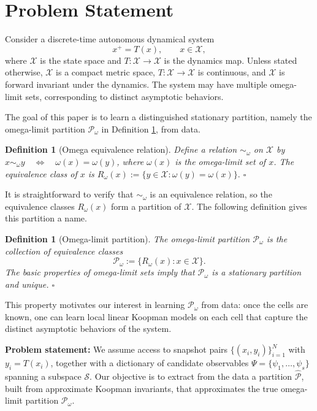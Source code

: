 \documentclass[letterpaper, 10 pt, conference]{ieeeconf}
\newcommand{\Pc}{\mathcal{P}}
\newcommand{\Sc}{\mathcal{S}}
\newcommand{\Xc}{\mathcal{X}}
\newcommand{\oprocendsymbol}{\hbox{$\square$}}
\newcommand{\oprocend}{\relax\ifmmode\else\unskip\hfill\fi\oprocendsymbol}
\newtheorem{definition}[theorem]{Definition}
\begin{document}
\section{Problem Statement}
Consider a discrete-time autonomous dynamical system
\begin{equation}
\label{eq:dynamics}
    x^+ = T(x), \qquad x \in \Xc,
\end{equation}
where $\Xc$ is the state space and $T:\Xc\to \Xc$ is the dynamics map. Unless stated otherwise, $\Xc$ is a compact metric space, $T:\Xc\to\Xc$ is continuous, and $\Xc$ is forward invariant under the dynamics. The system may have multiple omega-limit sets, corresponding to distinct asymptotic behaviors.

The goal of this paper is to learn a distinguished stationary partition, namely the omega-limit partition $\mathcal P_\omega$ in Definition \ref{def:omega_limit_partition}, from data.
\begin{definition}[Omega equivalence relation]
Define a relation $\sim_\omega$ on $\Xc$ by $    x\sim_\omega y
    \quad\Longleftrightarrow\quad
    \omega(x)=\omega(y)$, where $\omega(x)$ is the omega-limit set of $x$.
The equivalence class of $x$ is $R_\omega(x)
    :=
    \{y\in\Xc:\omega(y)=\omega(x)\}.$
\oprocend
\end{definition}

\smallskip
It is straightforward to verify that $\sim_\omega$ is an equivalence relation, so the equivalence classes $R_\omega(x)$ form a partition of $\Xc$. The following definition gives this partition a name.

\begin{definition}[Omega-limit partition]\label{def:omega_limit_partition}
The omega-limit partition $\Pc_{\omega}$ is the collection of equivalence classes
\begin{equation}
    \mathcal P_\omega
    :=
    \{R_\omega(x):x\in\Xc\}.
\end{equation}
The basic properties of omega-limit sets imply that $\mathcal P_\omega$ is a stationary partition and unique. \oprocend
\end{definition}
\smallskip

This property motivates our interest in learning $\mathcal P_\omega$ from data: once the cells are known, one can learn local linear Koopman models on each cell that capture the distinct asymptotic behaviors of the system.

\textbf{Problem statement:}
We assume access to snapshot pairs $\{(x_i, y_i)\}_{i=1}^N$ with $y_i = T(x_i)$, together with a dictionary of candidate observables $\Psi = \{\psi_1, \dots, \psi_s\}$ spanning a subspace $\Sc$. Our objective is to extract from the data a partition $\hat{\mathcal P}$, built from approximate Koopman invariants, that approximates the true omega-limit partition $\mathcal P_\omega$.
\end{document}
